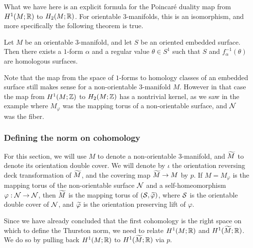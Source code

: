 What we have here is an explicit formula for the Poincar\'e duality map from $H^1(M; \mathbb{R})$ to $H_2(M; \mathbb{R})$.
For orientable $3$-manifolds, this is an isomorphism, and more specifically the following theorem is true.
\begin{thm}
  \label{thm:orientable-poincare-duality}
  Let $M$ be an orientable $3$-manifold, and let $S$ be an oriented embedded surface. Then there exists a $1$-form
  $\alpha$ and a regular value $\theta \in S^1$ such that $S$ and $f_{\alpha}^{-1}(\theta)$ are homologous surfaces.
\end{thm}

Note that the map from the space of $1$-forms to homology classes of an embedded surface still makes sense for a non-orientable $3$-manifold $M$.
However in that case the map from $H^1(M; \mathbb{Z})$ to $H_2(M; \mathbb{Z})$ has a nontrivial kernel, as we saw in the example where $M_{\varphi}$ was the mapping torus of a non-orientable surface, and $\mathcal{N}$ was the fiber.

\subsubsection*{Defining the norm on cohomology}
For this section, we will use $M$ to denote a non-orientable $3$-manifold, and $\widetilde{M}$ to denote its orientation double cover.
We will denote by $\iota$ the orientation reversing deck transformation
of $\widetilde{M}$, and the covering map $\widetilde{M} \to M$ by $p$.
If $M=M_\varphi$ is the mapping torus of the non-orientable surface $\mathcal{N}$ and a self-homeomorphism $\varphi: \mathcal{N} \to \mathcal{N}$, then $\widetilde{M}$ is the mapping torus of $(\mathcal{S}, \widetilde{\varphi})$, where $\mathcal{S}$ is the orientable double cover of $\mathcal{N}$, and $\widetilde{\varphi}$ is the orientation preserving lift of $\varphi$.

Since we have already concluded that the first cohomology is the right space on which to define the Thurston norm, we need to relate $H^1(M; \mathbb{R})$ and $H^1(\widetilde{M}; \mathbb{R})$. We do so by pulling back $H^1(M;\mathbb{R})$ to $H^1(\widetilde{M};\mathbb{R})$ via $p$.

